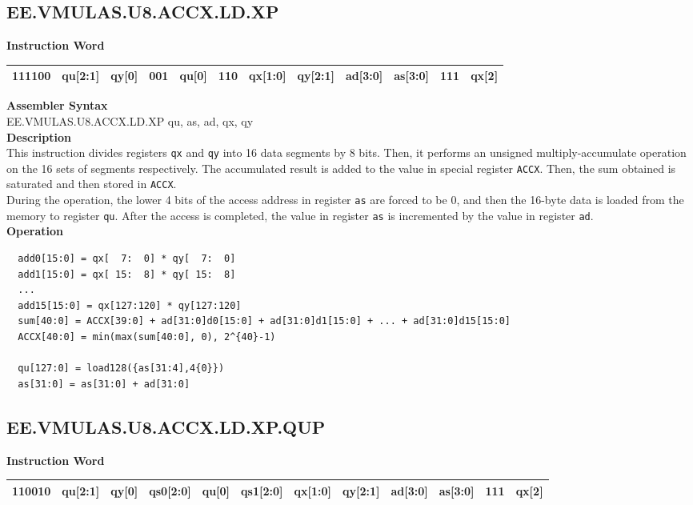 \clearpage
\subsection{EE.VMULAS.U8.ACCX.LD.XP}\label{instruction:EEVMULASU8ACCXLDXP}
\setlength\tabcolsep{6pt}
\textbf{Instruction Word} \\
\begin{tabular}{|c|c|c|c|c|c|c|c|c|c|c|c|}
	\hline
	111100 & qu[2:1] & qy[0] & 001 & qu[0] & 110 & qx[1:0] & qy[2:1] & ad[3:0] & as[3:0] & 111 & qx[2] \\
	\hline
\end{tabular}

\textbf{Assembler Syntax} \\
EE.VMULAS.U8.ACCX.LD.XP qu, as, ad, qx, qy \\
\textbf{Description} \\
This instruction divides registers \lstinline{qx} and \lstinline{qy} into 16 data segments by 8 bits. Then, it performs an unsigned multiply-accumulate operation on the 16 sets of segments respectively. The accumulated result is added to the value in special register \lstinline{ACCX}. Then, the sum obtained is saturated and then stored in \lstinline{ACCX}.\\
During the operation, the lower 4 bits of the access address in register \lstinline{as} are forced to be 0, and then the 16-byte data is loaded from the memory to register \lstinline{qu}. After the access is completed, the value in register \lstinline{as} is incremented by the value in register \lstinline{ad}.\\
\textbf{Operation}
\begin{lstlisting}
  add0[15:0] = qx[  7:  0] * qy[  7:  0]
  add1[15:0] = qx[ 15:  8] * qy[ 15:  8]
  ...
  add15[15:0] = qx[127:120] * qy[127:120]
  sum[40:0] = ACCX[39:0] + ad[31:0]d0[15:0] + ad[31:0]d1[15:0] + ... + ad[31:0]d15[15:0]
  ACCX[40:0] = min(max(sum[40:0], 0), 2^{40}-1)

  qu[127:0] = load128({as[31:4],4{0}})
  as[31:0] = as[31:0] + ad[31:0]
\end{lstlisting}

\clearpage
\subsection{EE.VMULAS.U8.ACCX.LD.XP.QUP}\label{instruction:EEVMULASU8ACCXLDXPQUP}
\setlength\tabcolsep{6pt}
\textbf{Instruction Word} \\
\begin{tabular}{|c|c|c|c|c|c|c|c|c|c|c|c|}
	\hline
	110010 & qu[2:1] & qy[0] & qs0[2:0] & qu[0] & qs1[2:0] & qx[1:0] & qy[2:1] & ad[3:0] & as[3:0] & 111 & qx[2] \\
	\hline
\end{tabular}

